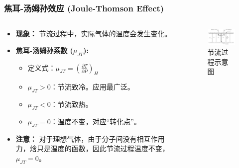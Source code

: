 \documentclass{beamer}
\begin{document}
\begin{frame}
  \frametitle{焦耳-汤姆孙效应 (Joule-Thomson Effect)}
  \begin{columns}[T]
    \begin{column}{0.6\textwidth}
      \begin{itemize}
        \item \textbf{现象：} 节流过程中，实际气体的\alert{温度会发生变化}。
        \vfill
        \item \textbf{焦耳-汤姆孙系数 ($\mu_{JT}$):}
        \begin{itemize}
          \item 定义式：$\mu_{JT} = \left(\frac{\partial T}{\partial P}\right)_H$
          \item $\mu_{JT} > 0$：\alert{节流致冷}。应用最广泛。
          \item $\mu_{JT} < 0$：节流致热。
          \item $\mu_{JT} = 0$：温度不变，对应“转化点”。
        \end{itemize}
        \vfill
        \item \textbf{注意：} 对于\alert{理想气体}，由于分子间没有相互作用力，焓只是温度的函数，因此节流过程温度不变，$\mu_{JT} = 0$。
      \end{itemize}
    \end{column}

    \begin{column}{0.4\textwidth}
      \begin{figure}
       \centering
       \includegraphics[width=5cm]{image.png}
       \caption{节流过程示意图}
       \end{figure}
    \end{column}
  \end{columns}
\end{frame}
\end{document}
